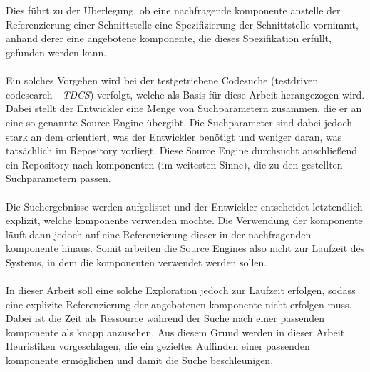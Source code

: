 \\\\
Dies führt zu der Überlegung, ob eine nachfragende \gls{komponente} anstelle der Referenzierung einer Schnittstelle eine Spezifizierung der Schnittstelle vornimmt, anhand derer eine angebotene \gls{komponente}, die dieses Spezifikation erfüllt, gefunden werden kann.
\\\\
Ein solches Vorgehen wird bei der testgetriebene Codesuche (testdriven codesearch - \emph{TDCS}) verfolgt, welche als Basis für diese Arbeit herangezogen wird. Dabei stellt der Entwickler eine Menge von Suchparametern zusammen, die er an eine so genannte Source Engine übergibt. Die Suchparameter sind dabei jedoch stark an dem orientiert, was der Entwickler benötigt und weniger daran, was tatsächlich im Repository vorliegt. Diese Source Engine durchsucht anschließend ein Repository nach \gls{komponente}n (im weitesten Sinne), die zu den gestellten Suchparametern passen. 
\\\\
Die Suchergebnisse werden aufgelistet und der Entwickler entscheidet letztendlich explizit, welche \gls{komponente} verwenden möchte. Die Verwendung der \gls{komponente} läuft dann jedoch auf eine Referenzierung dieser in der nachfragenden \gls{komponente} hinaus. Somit arbeiten die Source Engines also nicht zur Laufzeit des Systems, in dem die \gls{komponente}n verwendet werden sollen.
\\\\
In dieser Arbeit soll eine solche Exploration jedoch zur Laufzeit erfolgen, sodass eine explizite Referenzierung der angebotenen \gls{komponente} nicht erfolgen muss. Dabei ist die Zeit als Ressource während der Suche nach einer passenden \gls{komponente} als knapp anzusehen. Aus diesem Grund werden in dieser Arbeit Heuristiken vorgeschlagen, die ein gezieltes Auffinden einer passenden \gls{komponente} ermöglichen und damit die Suche beschleunigen.

